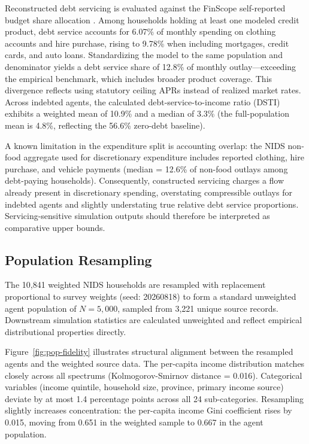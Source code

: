 Reconstructed debt servicing is evaluated against the \ac{FinScope} self-reported budget share allocation \cite{finscope2019}.
Among households holding at least one modeled credit product, debt service accounts for 6.07\% of monthly spending on clothing accounts and hire purchase, rising to 9.78\% when including mortgages, credit cards, and auto loans.
Standardizing the model to the same population and denominator yields a debt service share of 12.8\% of monthly outlay—exceeding the empirical benchmark, which includes broader product coverage.
This divergence reflects using statutory ceiling \acp{APR} instead of realized market rates.
Across indebted agents, the calculated debt-service-to-income ratio (\ac{DSTI}) exhibits a weighted mean of 10.9\% and a median of 3.3\% (the full-population mean is 4.8\%, reflecting the 56.6\% zero-debt baseline).

A known limitation in the expenditure split is accounting overlap: the \ac{NIDS} non-food aggregate used for discretionary expenditure includes reported clothing, hire purchase, and vehicle payments (median = 12.6\% of non-food outlays among debt-paying households).
Consequently, constructed servicing charges a flow already present in discretionary spending, overstating compressible outlays for indebted agents and slightly understating true relative debt service proportions.
Servicing-sensitive simulation outputs should therefore be interpreted as comparative upper bounds.

\subsection{Population Resampling}
\label{sec:resample}

The 10{,}841 weighted \ac{NIDS} households are resampled with replacement proportional to survey weights (seed: 20260818) to form a standard unweighted agent population of $N = 5{,}000$, sampled from 3{,}221 unique source records.
Downstream simulation statistics are calculated unweighted and reflect empirical distributional properties directly.

Figure~\ref{fig:pop-fidelity} illustrates structural alignment between the resampled agents and the weighted source data.
The per-capita income distribution matches closely across all spectrums (Kolmogorov-Smirnov distance = 0.016).
Categorical variables (income quintile, household size, province, primary income source) deviate by at most 1.4 percentage points across all 24 sub-categories.
Resampling slightly increases concentration: the per-capita income Gini coefficient rises by 0.015, moving from 0.651 in the weighted sample to 0.667 in the agent population.

